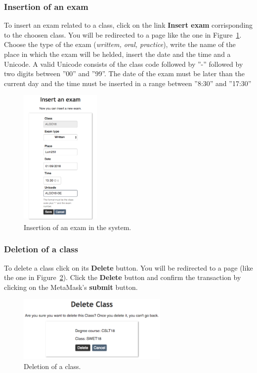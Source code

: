 \subsubsection{Insertion of an exam} \label{subsec:exaIns}
To insert an exam related to a class, click on the link \textbf{Insert exam} corrisponding to the choosen class. You will be redirected to a page like the one in Figure~\ref{fig:insertExam}. Choose the type of the exam (\emph{writtem, oral, practice}), write the name of the place in which the exam will be helded, insert the date and the time and a Unicode. A valid Unicode consists of the class code followed by ''-'' followed by two digits between ''00'' and ''99''. The date of the exam must be later than the current day and the time must be inserted in a range between ''8:30'' and ''17:30''
\begin{figure}[H]
	\centering
	\includegraphics[width=0.35\textwidth]{img/insertExam.png}
	\caption{Insertion of an exam in the system.}
	\label{fig:insertExam}
\end{figure}

\subsubsection{Deletion of a class}
To delete a class click on its \textbf{Delete} button. You will be redirected to a page (like the one in Figure~\ref{fig:deleteClass}). Click the \textbf{Delete} button and confirm the transaction by clicking on the MetaMask's \textbf{submit} button.
\begin{figure}[H]
	\centering
	\includegraphics[width=0.65\textwidth]{img/deleteClass.png}
	\caption{Deletion of a class.}
	\label{fig:deleteClass}
\end{figure}

